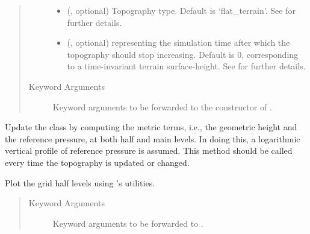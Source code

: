 \documentclass[letterpaper,10pt,english]{sphinxmanual}
\begin{document}
\begin{fulllineitems}
\begin{fulllineitems}
\begin{quote}
\begin{description}
\begin{itemize}
\item {} 
 (, optional) \textendash{} Topography type. Default is ‘flat\_terrain’. See {\hyperref[\detokenize{api:module-grids.topography}]{}} for further details.

\item {} 
 (, optional) \textendash{}  representing the simulation time after which the topography should stop
increasing. Default is 0, corresponding to a time-invariant terrain surface-height. See {\hyperref[\detokenize{api:module-grids.topography}]{}}
for further details.

\end{itemize}

\item[{Keyword Arguments}] \leavevmode
{} \textendash{} Keyword arguments to be forwarded to the constructor of {\hyperref[\detokenize{api:grids.topography.Topography1d}]{}}.

\end{description}\end{quote}

\end{fulllineitems}


\begin{fulllineitems}
\label{\detokenize{api:grids.sigma.Sigma2d._update_metric_terms}}
Update the class by computing the metric terms, i.e., the geometric height and the reference pressure,
at both half and main levels. In doing this, a logarithmic vertical profile of reference pressure is assumed.
This method should be called every time the topography is updated or changed.

\end{fulllineitems}


\begin{fulllineitems}
\label{\detokenize{api:grids.sigma.Sigma2d.plot}}
Plot the grid half levels using ’s utilities.
\begin{quote}\begin{description}
\item[{Keyword Arguments}] \leavevmode
{} \textendash{} Keyword arguments to be forwarded to .


\end{description}
\end{quote}
\end{fulllineitems}
\end{fulllineitems}
\end{document}
